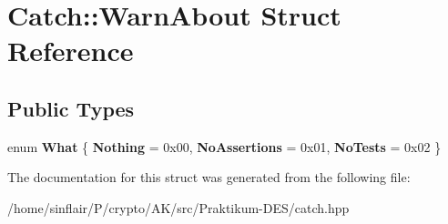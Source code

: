 \hypertarget{structCatch_1_1WarnAbout}{}\section{Catch\+:\+:Warn\+About Struct Reference}
\label{structCatch_1_1WarnAbout}
\subsection*{Public Types}
\begin{DoxyCompactItemize}
\item 
\mbox{\label{structCatch_1_1WarnAbout_ae3dde70ef78d700ea896eb29314e0fa3}} 
enum {\bfseries What} \{ {\bfseries Nothing} = 0x00, 
{\bfseries No\+Assertions} = 0x01, 
{\bfseries No\+Tests} = 0x02
 \}
\end{DoxyCompactItemize}


The documentation for this struct was generated from the following file\+:\begin{DoxyCompactItemize}
\item 
/home/sinflair/\+P/crypto/\+A\+K/src/\+Praktikum-\/\+D\+E\+S/catch.\+hpp\end{DoxyCompactItemize}

